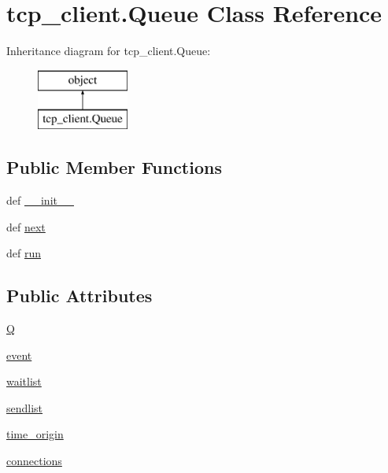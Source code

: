 \hypertarget{classtcp__client_1_1_queue}{\section{tcp\-\_\-client.\-Queue Class Reference}
\label{classtcp__client_1_1_queue}
}
Inheritance diagram for tcp\-\_\-client.\-Queue\-:\begin{figure}[H]
\begin{center}
\leavevmode
\includegraphics[height=2.000000cm]{classtcp__client_1_1_queue}
\end{center}
\end{figure}
\subsection*{Public Member Functions}
\begin{DoxyCompactItemize}
\item 
def \hyperlink{classtcp__client_1_1_queue_ab0df6abd257ea9a0ed489b519d0a3be8}{\-\_\-\-\_\-init\-\_\-\-\_\-}
\item 
def \hyperlink{classtcp__client_1_1_queue_ae86fb384d543cc9546ba747033995b8e}{next}
\item 
def \hyperlink{classtcp__client_1_1_queue_a0ad188422dd352a1cfecd4b73c63e719}{run}
\end{DoxyCompactItemize}
\subsection*{Public Attributes}
\begin{DoxyCompactItemize}
\item 
\hyperlink{classtcp__client_1_1_queue_ad1d79a3f78925181c48bae6c7fee899d}{Q}
\item 
\hyperlink{classtcp__client_1_1_queue_a0843d2bd2c1a7e5e237c2948fa1247e6}{event}
\item 
\hyperlink{classtcp__client_1_1_queue_ad872c06b7212edb7df8adbf02f77eb50}{waitlist}
\item 
\hyperlink{classtcp__client_1_1_queue_a7d5e8ff7e6e26fc8a0914872547b6690}{sendlist}
\item 
\hyperlink{classtcp__client_1_1_queue_a8030358b15948a4260c5a41661982622}{time\-\_\-origin}
\item 
\hyperlink{classtcp__client_1_1_queue_aea5f1243cbc1d111dfa33578426e2591}{connections}
\end{DoxyCompactItemize}


